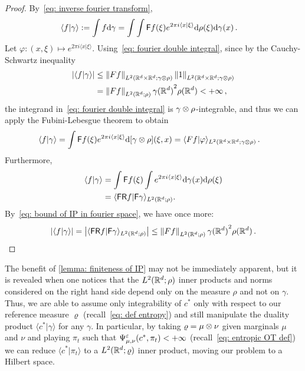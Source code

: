 \begin{proof}
    By~\eqref{eq: inverse fourier transform}, 
    \begin{align}
        \langle f\vert\gamma\rangle:=\int f\mathrm{d} \gamma &=\int\int \mathsf{F} f(\xi)e^{2\pi i\langle x\vert \xi\rangle}\mathrm{d}\rho(\xi)\mathrm{d}\gamma(x)\,.\label{eq: fourier double integral}
    \end{align}
Let $\varphi:(x,\xi)\mapsto e^{2\pi i \langle x\vert\xi\rangle}$. Using~\eqref{eq: fourier double integral}, since by the Cauchy-Schwartz inequality
\begin{align}
    \left\lvert \langle f\vert\gamma\rangle \right\rvert &\le \left\lVert Ff\right\rVert_{L^2(\mathbb{R}^d\times\mathbb{R}^d;\gamma\otimes\rho)}\left\lVert1\right\rVert_{L^2(\mathbb{R}^d\times\mathbb{R}^d;\gamma\otimes\rho)}\notag\\
    &= \left\lVert Ff\right\rVert_{L^2(\mathbb{R}^d;\rho)}\gamma{(\mathbb{R}^d)}^2\rho(\mathbb{R}^d)<+\infty\label{eq: bound of IP in fourier space}\,,
\end{align}
the integrand in~\eqref{eq: fourier double integral} is $\gamma\otimes\rho$-integrable, and thus we can apply the Fubini-Lebesgue theorem to obtain
\begin{align*}
    \langle f\vert\gamma\rangle&= \int \mathsf{F} f(\xi) e^{2\pi i\langle x\vert \xi\rangle}\mathrm{d}[\gamma\otimes\rho](\xi,x)=\langle Ff\vert \varphi\rangle_{L^2(\mathbb{R}^d\times\mathbb{R}^d;\gamma\otimes\rho)}\,.
\end{align*}
Furthermore,
    \begin{align*}
        \langle f\vert\gamma\rangle&= \int \mathsf{F} f(\xi)\int e^{2\pi i\langle x\vert \xi\rangle}\mathrm{d}\gamma(x)\mathrm{d}\rho(\xi)\\
        &= \langle \mathsf{F}\mathsf{R} f\vert \mathsf{F} \gamma\rangle_{L^2(\mathbb{R}^d;\rho)}.
    \end{align*}
By~\eqref{eq: bound of IP in fourier space}, we have once more:
    \[
        \abs{\langle f\vert\gamma\rangle}=\abs{\langle \fourier\reflection f\vert \fourier \gamma\rangle_{L^2(\Rb^d;\rho)}} \le \norm{Ff}_{L^2(\Rb^d;\rho)}\gamma{(\Rb^d)}^2\rho(\Rb^d)\,. %
    \]
\end{proof}

The benefit of \cref{lemma: finiteness of IP} may not be immediately apparent, but it is revealed when one notices that the $L^2(\mathbb{R}^d;\rho)$ inner products and norms considered on the right hand side depend only on the measure $\rho$ and not on $\gamma$. Thus, we are able to assume only integrability of $c^*$ only with respect to our reference measure $\varrho$ (recall~\eqref{eq: def entropy}) and still manipulate the duality product $\langle c^*\vert \gamma\rangle$ for any $\gamma$. In particular, by taking $\varrho=\mu\otimes\nu$ given marginals $\mu$ and $\nu$ and playing $\pi_t$ such that $\Psi_{\mu,\nu}^\varepsilon(c^*,\pi_t)<+\infty$ (recall~\eqref{eq: entropic OT def}) we can reduce $\langle c^*\vert \pi_t\rangle$ to a $L^2(\mathbb{R}^d;\varrho)$ inner product, moving our problem to a Hilbert space.


